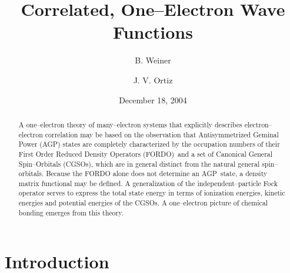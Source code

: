 \documentclass[aps,preprint]{revtex4}%
\begin{document}
\preprint{ }
\title{Correlated, One--Electron Wave Functions}
\author{B. Weiner}
\author{J. V. Ortiz}
\pacs{}

\begin{abstract}
A one--electron theory of many--electron systems that explicitly describes
electron--electron correlation may be based on the observation that
Antisymmetrized Geminal Power (AGP) states are completely characterized by the
occupation numbers of their First Order Reduced Density Operators (FORDO)\ and
a set of Canonical General Spin--Orbitals (CGSOs), which are in general
distinct from the natural general spin--orbitals. Because the FORDO alone does
not determine an AGP\ state, a density matrix functional may be defined. A
generalization of the independent--particle Fock operator serves to express
the total state energy in terms of ionization energies, kinetic energies and
potential energies of the CGSOs. A one--electron picture of chemical bonding
emerges from this theory.

\end{abstract}
\date{December 18, 2004}
\maketitle




\section{Introduction \label{intro}}
\end{document}

